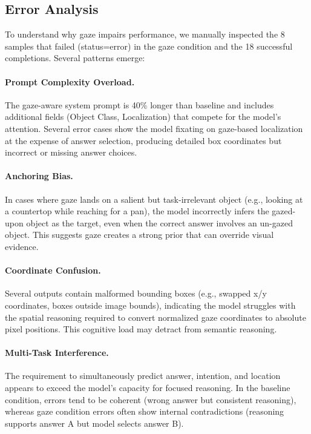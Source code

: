 \documentclass[11pt]{article}
\begin{document}
\subsection{Error Analysis}
To understand why gaze impairs performance, we manually inspected the 8 samples that failed (status=error) in the gaze condition and the 18 successful completions. Several patterns emerge:

\paragraph{Prompt Complexity Overload.} The gaze-aware system prompt is 40\% longer than baseline and includes additional fields (Object Class, Localization) that compete for the model's attention. Several error cases show the model fixating on gaze-based localization at the expense of answer selection, producing detailed box coordinates but incorrect or missing answer choices.

\paragraph{Anchoring Bias.} In cases where gaze lands on a salient but task-irrelevant object (e.g., looking at a countertop while reaching for a pan), the model incorrectly infers the gazed-upon object as the target, even when the correct answer involves an un-gazed object. This suggests gaze creates a strong prior that can override visual evidence.

\paragraph{Coordinate Confusion.} Several outputs contain malformed bounding boxes (e.g., swapped x/y coordinates, boxes outside image bounds), indicating the model struggles with the spatial reasoning required to convert normalized gaze coordinates to absolute pixel positions. This cognitive load may detract from semantic reasoning.

\paragraph{Multi-Task Interference.} The requirement to simultaneously predict answer, intention, and location appears to exceed the model's capacity for focused reasoning. In the baseline condition, errors tend to be coherent (wrong answer but consistent reasoning), whereas gaze condition errors often show internal contradictions (reasoning supports answer A but model selects answer B).
\end{document}
